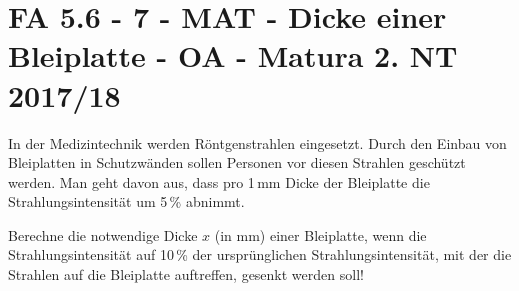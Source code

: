 \section{FA 5.6 - 7 - MAT - Dicke einer Bleiplatte - OA - Matura 2. NT 2017/18}

\begin{beispiel}[FA 5.6]{1}
In der Medizintechnik werden Röntgenstrahlen eingesetzt. Durch den Einbau von Bleiplatten in Schutzwänden sollen Personen vor diesen Strahlen geschützt werden. Man geht davon aus,
dass pro 1\,mm Dicke der Bleiplatte die Strahlungsintensität um 5\,\% abnimmt.

Berechne die notwendige Dicke $x$ (in mm) einer Bleiplatte, wenn die Strahlungsintensität auf 10\,\% der ursprünglichen Strahlungsintensität, mit der die Strahlen auf die Bleiplatte auftreffen, gesenkt werden soll!

\end{beispiel}